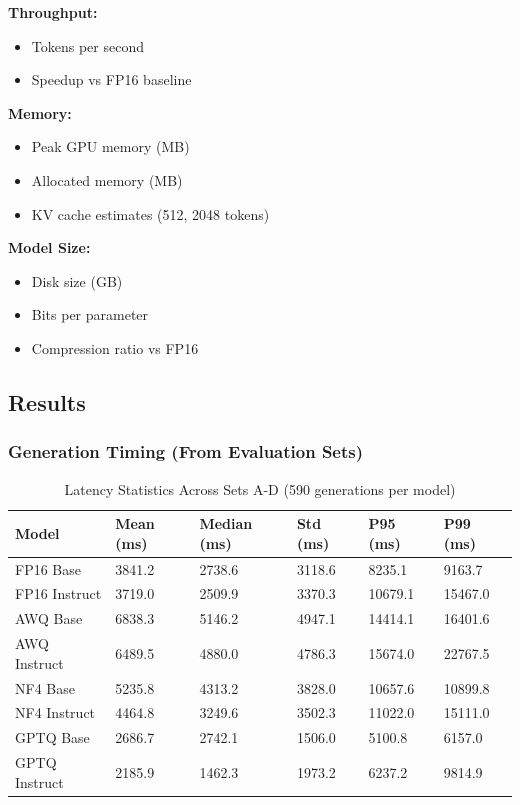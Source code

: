 \documentclass[11pt,a4paper]{article}
\begin{document}
\textbf{Throughput:}
\begin{itemize}
\item Tokens per second
\item Speedup vs FP16 baseline
\end{itemize}

\textbf{Memory:}
\begin{itemize}
\item Peak GPU memory (MB)
\item Allocated memory (MB)
\item KV cache estimates (512, 2048 tokens)
\end{itemize}

\textbf{Model Size:}
\begin{itemize}
\item Disk size (GB)
\item Bits per parameter
\item Compression ratio vs FP16
\end{itemize}

\subsection{Results}

\subsubsection{Generation Timing (From Evaluation Sets)}

\begin{table}[H]
\centering
\caption{Latency Statistics Across Sets A-D (590 generations per model)}
\small
\begin{tabularx}{\textwidth}{@{}X C{1.5cm} C{1.5cm} C{1.5cm} C{1.5cm} C{1.5cm}@{}}
\toprule
\textbf{Model} & \textbf{Mean (ms)} & \textbf{Median (ms)} & \textbf{Std (ms)} & \textbf{P95 (ms)} & \textbf{P99 (ms)} \\
\midrule
FP16 Base & 3841.2 & 2738.6 & 3118.6 & 8235.1 & 9163.7 \\
FP16 Instruct & 3719.0 & 2509.9 & 3370.3 & 10679.1 & 15467.0 \\
AWQ Base & 6838.3 & 5146.2 & 4947.1 & 14414.1 & 16401.6 \\
AWQ Instruct & 6489.5 & 4880.0 & 4786.3 & 15674.0 & 22767.5 \\
NF4 Base & 5235.8 & 4313.2 & 3828.0 & 10657.6 & 10899.8 \\
NF4 Instruct & 4464.8 & 3249.6 & 3502.3 & 11022.0 & 15111.0 \\
GPTQ Base & 2686.7 & 2742.1 & 1506.0 & 5100.8 & 6157.0 \\
GPTQ Instruct & 2185.9 & 1462.3 & 1973.2 & 6237.2 & 9814.9 \\
\bottomrule
\end{tabularx}
\end{table}
\end{document}
